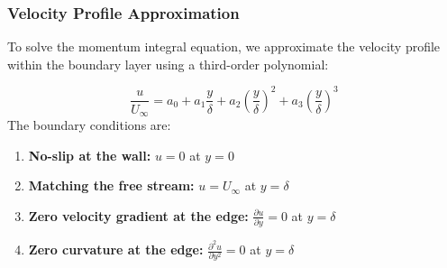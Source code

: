 










\subsubsection*{Velocity Profile Approximation}

To solve the momentum integral equation, we approximate the velocity profile within the boundary layer using a third-order polynomial:

\[
\frac{u}{U_\infty} = a_0 + a_1\frac{y}{\delta} + a_2\left(\frac{y}{\delta}\right)^2 + a_3\left(\frac{y}{\delta}\right)^3
\]
%
The boundary conditions are:
%
\begin{enumerate}
    \item \textbf{No-slip at the wall:} $u = 0$ at $y = 0$
    \item \textbf{Matching the free stream:} $u = U_\infty$ at $y = \delta$
    \item \textbf{Zero velocity gradient at the edge:} $\frac{\partial u}{\partial y} = 0$ at $y = \delta$
    \item \textbf{Zero curvature at the edge:} $\frac{\partial^2 u}{\partial y^2} = 0$ at $y = \delta$
\end{enumerate}

